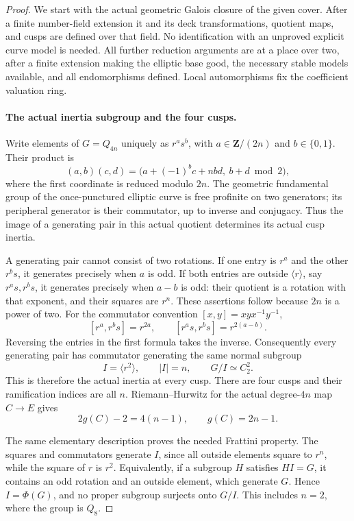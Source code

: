 \begin{proof}
We start with the actual geometric Galois closure of the given
cover. After a finite number-field extension it and its deck
transformations, quotient maps, and cusps are defined over that
field. No identification with an unproved explicit curve model
is needed. All further reduction arguments are at a place over
two, after a finite extension making the elliptic base good,
the necessary stable models available, and all endomorphisms
defined. Local automorphisms fix the coefficient valuation ring.

\paragraph{The actual inertia subgroup and the four cusps.}
Write elements of \(G=Q_{4n}\) uniquely as \(r^a s^b\), with
\(a\in\mathbf Z/(2n)\) and \(b\in\{0,1\}\). Their product is
\[
 (a,b)(c,d)=\bigl(a+(-1)^b c+n b d,\ b+d\bmod2\bigr),
                                                        \tag{A.72.2}
\]
where the first coordinate is reduced modulo \(2n\).
The geometric fundamental group of the once-punctured elliptic
curve is free profinite on two generators; its peripheral
generator is their commutator, up to inverse and conjugacy.
Thus the image of a generating pair in this actual quotient
determines its actual cusp inertia.

A generating pair cannot consist of two rotations. If one entry
is \(r^a\) and the other \(r^b s\), it generates precisely
when \(a\) is odd. If both entries are outside
\(\langle r\rangle\), say \(r^a s,r^b s\), it generates
precisely when \(a-b\) is odd: their quotient is a rotation
with that exponent, and their squares are \(r^n\).
These assertions follow because \(2n\) is a power of two.
For the commutator convention \([x,y]=xyx^{-1}y^{-1}\),
\[
 [r^a,r^b s]=r^{2a},\qquad
 [r^a s,r^b s]=r^{2(a-b)}.                         \tag{A.72.3}
\]
Reversing the entries in the first formula takes the inverse.
Consequently every generating pair has commutator generating
the same normal subgroup
\[
                 I=\langle r^2\rangle,
 \qquad |I|=n,\qquad G/I\simeq C_2^2.             \tag{A.72.4}
\]
This is therefore the actual inertia at every cusp. There are
four cusps and their ramification indices are all \(n\).
Riemann--Hurwitz for the actual degree-\(4n\) map \(C\to E\)
gives
\[
                    2g(C)-2=4(n-1),
                    \qquad g(C)=2n-1.             \tag{A.72.5}
\]

The same elementary description proves the needed Frattini
property. The squares and commutators generate \(I\), since
all outside elements square to \(r^n\), while the square of
\(r\) is \(r^2\). Equivalently, if a subgroup \(H\) satisfies
\(HI=G\), it contains an odd rotation and an outside element,
which generate \(G\). Hence \(I=\Phi(G)\), and no proper
subgroup surjects onto \(G/I\). This includes \(n=2\), where
the group is \(Q_8\).


\end{proof}
